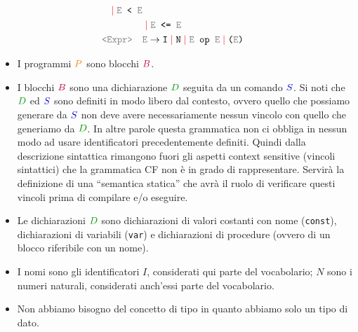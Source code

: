 \documentclass[a4paper]{article}
\begin{document}
\[\begin{aligned}
                    \color{red}\color{red}\mid\color{black}\color{black} \texttt{\color{gray}E\color{black}\ < \color{gray}E\color{black}} \\
                   & \color{red}\color{red}\mid\color{black}\color{black} \texttt{\color{gray}E\color{black}\ <= \color{gray}E\color{black}} \\
    \texttt{\color{gray}<Expr>} \quad & \texttt{\color{gray}E\color{black}} \to
    \texttt{I} \color{red}\color{red}\mid\color{black}\color{black} \texttt{N} 
                      \color{red}\color{red}\mid\color{black}\color{black} \texttt{\color{gray}E\color{black}\ op \color{gray}E\color{black}} 
                      \color{red}\color{red}\mid\color{black}\color{black} \texttt{(\color{gray}E\color{black})}
  \end{aligned}
\] 
\begin{itemize}
  \item I programmi \( \color{orange}P \) sono blocchi \( \color{purple}B \).
  \item I blocchi \( \color{purple}B \) sono una dichiarazione \( \color{green!60!black}D \)
    seguita da un comando \( \color{blue!80!black}S \).
    Si noti che \( \color{green!60!black}D \) ed \( \color{blue!80!black}S \) sono definiti in modo
    libero dal contesto, ovvero quello che possiamo generare da \( \color{blue!80!black}S \)
    non deve avere necessariamente nessun vincolo con quello che generiamo da
    \( \color{green!60!black}D \). In altre parole questa grammatica non ci obbliga in nessun
    modo ad usare identificatori precedentemente definiti. Quindi dalla descrizione
    sintattica rimangono fuori gli aspetti context sensitive (vincoli sintattici)
    che la grammatica CF non è in grado di rappresentare. Servirà la definizione di
    una “semantica statica” che avrà il ruolo di verificare questi vincoli prima di
    compilare e/o eseguire.

  \item Le dichiarazioni \( \color{green!60!black}D \) sono dichiarazioni di valori costanti
    con nome (\texttt{const}), dichiarazioni di variabili (\texttt{var}) e
    dichiarazioni di procedure (ovvero di un blocco riferibile con un nome).

  \item I nomi sono gli identificatori \( I \), considerati qui parte del vocabolario;
    \( N \) sono i numeri naturali, considerati anch’essi parte del vocabolario.

  \item Non abbiamo bisogno del concetto di tipo in quanto abbiamo solo un tipo di dato.


\end{itemize}
\end{document}
